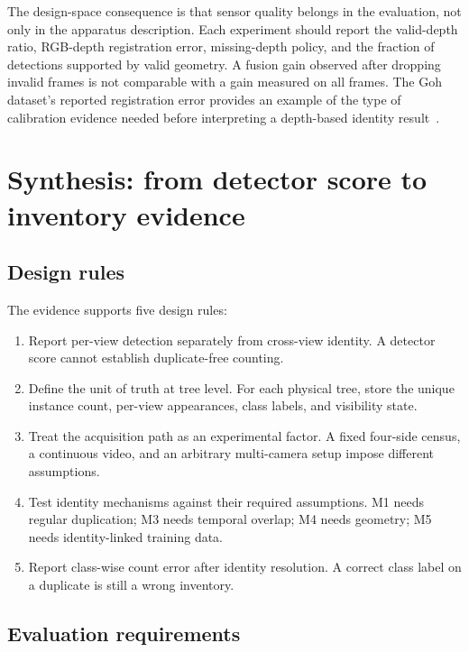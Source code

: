 The design-space consequence is that sensor quality belongs in the evaluation, not only in the apparatus description. Each experiment should report the valid-depth ratio, RGB-depth registration error, missing-depth policy, and the fraction of detections supported by valid geometry. A fusion gain observed after dropping invalid frames is not comparable with a gain measured on all frames. The Goh dataset's reported registration error provides an example of the type of calibration evidence needed before interpreting a depth-based identity result~\cite{goh2025palmdataset}.


\section{Synthesis: from detector score to inventory evidence}
\label{sec:synthesis}

\subsection{Design rules}

The evidence supports five design rules:

\begin{enumerate}[leftmargin=*,itemsep=2pt]
  \item Report per-view detection separately from cross-view identity. A detector score cannot establish duplicate-free counting.
  \item Define the unit of truth at tree level. For each physical tree, store the unique instance count, per-view appearances, class labels, and visibility state.
  \item Treat the acquisition path as an experimental factor. A fixed four-side census, a continuous video, and an arbitrary multi-camera setup impose different assumptions.
  \item Test identity mechanisms against their required assumptions. M1 needs regular duplication; M3 needs temporal overlap; M4 needs geometry; M5 needs identity-linked training data.
  \item Report class-wise count error after identity resolution. A correct class label on a duplicate is still a wrong inventory.
\end{enumerate}

\subsection{Evaluation requirements}

